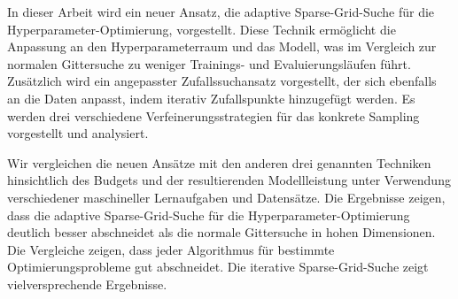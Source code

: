 In dieser Arbeit wird ein neuer Ansatz, die adaptive Sparse-Grid-Suche für die Hyperparameter-Optimierung, vorgestellt. Diese Technik ermöglicht die Anpassung an den Hyperparameterraum und das Modell, was im Vergleich zur normalen Gittersuche zu weniger Trainings- und Evaluierungsläufen führt. Zusätzlich wird ein angepasster Zufallssuchansatz vorgestellt, der sich ebenfalls an die Daten anpasst, indem iterativ Zufallspunkte hinzugefügt werden. Es werden drei verschiedene Verfeinerungsstrategien für das konkrete Sampling vorgestellt und analysiert. \newline

Wir vergleichen die neuen Ansätze mit den anderen drei genannten Techniken hinsichtlich des Budgets und der resultierenden Modellleistung unter Verwendung verschiedener maschineller Lernaufgaben und Datensätze. Die Ergebnisse zeigen, dass die adaptive Sparse-Grid-Suche für die Hyperparameter-Optimierung deutlich besser abschneidet als die normale Gittersuche in hohen Dimensionen. Die Vergleiche zeigen, dass jeder Algorithmus für bestimmte Optimierungsprobleme gut abschneidet. Die iterative Sparse-Grid-Suche zeigt vielversprechende Ergebnisse.
